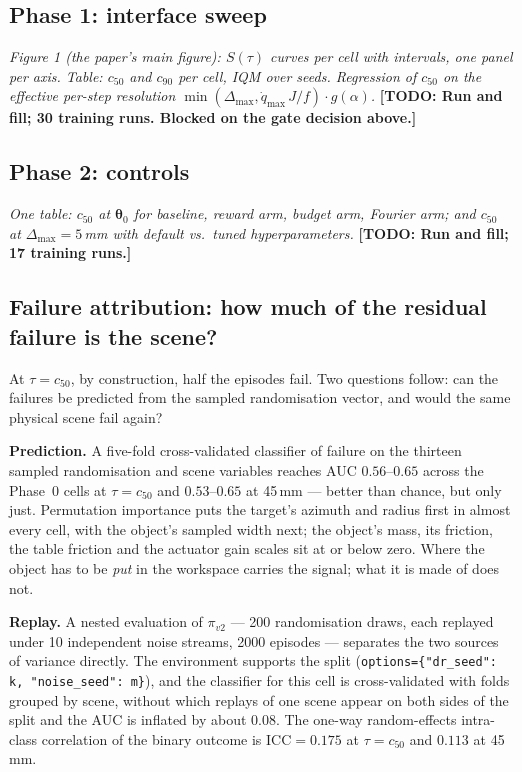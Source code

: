 \documentclass{article}
\newcommand{\todo}[1]{{\color{red}\textbf{[TODO: #1]}}}
\newcommand{\planned}[1]{{\color{blue!70!black}\textit{#1}}}
\newcommand{\dmax}{\Delta_{\max}}
\newcommand{\qdmax}{\dot q_{\max}}
\newcommand{\iface}{\boldsymbol{\theta}}
\begin{document}
\subsection{Phase 1: interface sweep}
\planned{Figure 1 (the paper's main figure): $S(\tau)$ curves per cell with
intervals, one panel per axis. Table: $c_{50}$ and $c_{90}$ per cell, IQM over
seeds. Regression of $c_{50}$ on the effective per-step resolution
$\min(\dmax, \qdmax\,J/f)\cdot g(\alpha)$.}
\todo{Run and fill; 30 training runs. Blocked on the gate decision above.}
\label{fig:sweep}

\subsection{Phase 2: controls}
\planned{One table: $c_{50}$ at $\iface_0$ for baseline, reward arm, budget arm,
Fourier arm; and $c_{50}$ at $\dmax{=}5$\,mm with default vs.\ tuned
hyperparameters.}
\todo{Run and fill; 17 training runs.}

\subsection{Failure attribution: how much of the residual failure is the scene?}
\label{sec:attrib-results}

At $\tau = c_{50}$, by construction, half the episodes fail. Two questions
follow: can the failures be predicted from the sampled randomisation vector, and
would the same physical scene fail again?

\textbf{Prediction.} A five-fold cross-validated classifier of failure on the
thirteen sampled randomisation and scene variables reaches AUC $0.56$--$0.65$
across the Phase~0 cells at $\tau = c_{50}$ and $0.53$--$0.65$ at 45\,mm ---
better than chance, but only just. Permutation importance puts the target's
azimuth and radius first in almost every cell, with the object's sampled width
next; the object's mass, its friction, the table friction and the actuator gain
scales sit at or below zero. Where the object has to be \emph{put} in the
workspace carries the signal; what it is made of does not.

\textbf{Replay.} A nested evaluation of $\pi_{v2}$ --- 200 randomisation draws,
each replayed under 10 independent noise streams, 2000 episodes --- separates
the two sources of variance directly. The environment supports the split
(\texttt{options=\{"dr\_seed": k, "noise\_seed": m\}}), and the classifier for
this cell is cross-validated with folds grouped by scene, without which replays
of one scene appear on both sides of the split and the AUC is inflated by about
0.08. The one-way random-effects intra-class correlation of the binary outcome
is $\mathrm{ICC} = 0.175$ at $\tau = c_{50}$ and $0.113$ at 45\,mm.
\end{document}

